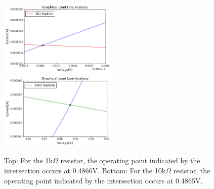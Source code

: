 \documentclass[authoryear, 12pt,5p, times]{elsarticle}
\begin{document}
\begin{figure}[h!]
\center
\includegraphics[width=0.5\textwidth]{figure/intersect}
\includegraphics[width=0.5\textwidth]{figure/intersect_10k}
\caption{Top: For the 1k$\Omega$ resistor, the operating point indicated by the intersection occurs at 0.4866V. Bottom: For the 10k$\Omega$ resistor, the operating point indicated by the intersection occurs at 0.4865V.}
\label{intersect}
\end{figure}
\end{document}
